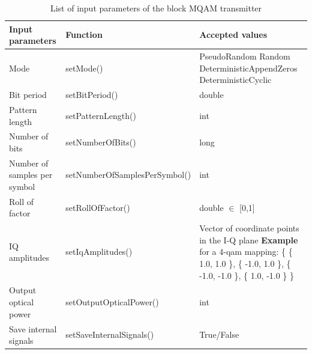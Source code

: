 \documentclass[a4paper]{article}
\begin{document}
\begin{table}
\begin{center}
	\begin{tabular}{| m{5cm} | m{} | m{5cm} | }
		\hline 
		\textbf{Input parameters} & \textbf{Function} & \textbf{Accepted values} \\ \hline
		Mode & setMode() & PseudoRandom \newline Random \newline DeterministicAppendZeros \newline DeterministicCyclic \\ \hline
		Bit period & setBitPeriod() & double \\ \hline
		Pattern length & setPatternLength() & int \\ \hline
		Number of bits & setNumberOfBits() & long \\ \hline
		Number of samples per symbol & setNumberOfSamplesPerSymbol() & int \\ \hline
		Roll of factor & setRollOfFactor() & double $\in$ [0,1] \\ \hline
		IQ amplitudes & setIqAmplitudes() & Vector of coordinate points in the I-Q plane \newline \textbf{Example} for a 4-qam mapping: \{ \{ 1.0, 1.0 \}, \{ -1.0, 1.0 \}, \{ -1.0, -1.0 \}, \{ 1.0, -1.0 \} \} \\ \hline
		Output optical power & setOutputOpticalPower() & int \\ \hline
		Save internal signals & setSaveInternalSignals() & True/False \\
		\hline
	\end{tabular}
	\caption{List of input parameters of the block MQAM transmitter} \label{table} 
\end{center}
\end{table}

\end{document}
